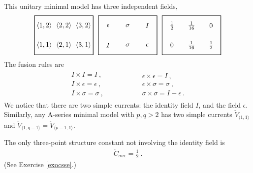 \documentclass[12pt, a4paper, notitlepage, twoside]{report}
\numberwithin{equation}{section}
\theoremstyle{break}
\begin{document}
This unitary minimal model has three independent fields, 
\begin{align}
 \begin{tikzpicture}[scale = .5, baseline=(current  bounding  box.center)]
  \draw[thick] (-1,-1) -- (-1, 3) -- (5, 3) -- (5, -1) -- cycle;
  \foreach \x in {1, ..., 3}{
  \foreach \y in {1, 2}{
  \node at ({2*(\x-1)}, {2*(\y-1)}) {$\langle \x,\y\rangle $};
  }}
 \end{tikzpicture}
 \ \ 
 \begin{tikzpicture}[scale = .5, baseline=(current  bounding  box.center)]
  \draw[thick] (-1,-1) -- (-1, 3) -- (5, 3) -- (5, -1) -- cycle;
  \node at (0, 0) {$I$};
  \node at (2, 0) {$\sigma$};
  \node at (4, 0) {$\epsilon$};
  \node at (0, 2) {$\epsilon$};
  \node at (2, 2) {$\sigma$};
  \node at (4, 2) {$I$};
 \end{tikzpicture}
 \ \ 
 \begin{tikzpicture}[scale = .5, baseline=(current  bounding  box.center)]
  \draw[thick] (-1,-1) -- (-1, 3) -- (5, 3) -- (5, -1) -- cycle;
  \node at (0, 0) {$0$};
  \node at (2, 0) {$\frac{1}{16}$};
  \node at (4, 0) {$\frac12$};
  \node at (0, 2) {$\frac12$};
  \node at (2, 2) {$\frac{1}{16}$};
  \node at (4, 2) {$0$};
 \end{tikzpicture}
\end{align}
The fusion rules are 
\begin{align}
\begin{array}{l}
 I\times I = I \ ,
\\ I\times \epsilon = \epsilon\ ,
\\ I\times \sigma = \sigma\ ,
\end{array}
\hspace{2cm}
\begin{array}{l}
 \epsilon\times \epsilon = I\ ,
\\ \epsilon\times \sigma = \sigma\ ,
\\ \sigma \times \sigma = I + \epsilon\ .
\end{array}
\end{align}
We notice that there are two simple currents: the identity field $I$, and the field $\epsilon$.
Similarly, any A-series minimal model with $p,q>2$ has two simple currents $\check{V}_{\langle 1,1 \rangle}$ and $\check{V}_{\langle 1,q-1 \rangle}=\check{V}_{\langle p-1,1 \rangle}$. 

The only three-point structure constant not involving the identity field is 
\begin{align}
 \check{C}_{\sigma\sigma\epsilon} =\frac12\ .
\label{csse}
\end{align}
(See Exercise \ref{exocsse}.)
\end{document}
